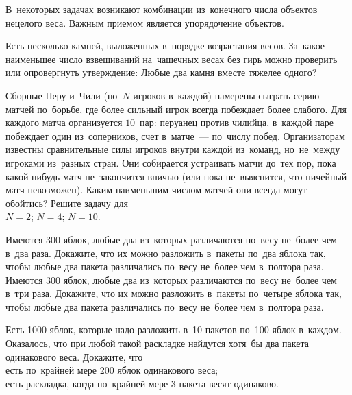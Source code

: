 



В~некоторых задачах возникают комбинации из~конечного числа объектов нецелого
веса.
Важным приемом является упорядочение объектов.

\begin{exercises}

\item
Есть несколько камней, выложенных в~порядке возрастания весов.
За~какое наименьшее число взвешиваний на~чашечных весах без гирь можно
проверить или опровергнуть утверждение: Любые два камня вместе тяжелее одного?

\item
Сборные Перу и~Чили (по~$N$ игроков в~каждой) намерены сыграть серию матчей
по~борьбе, где более сильный игрок всегда побеждает более слабого.
Для каждого матча организуется $10$~пар: перуанец против чилийца, в~каждой паре
побеждает один из~соперников, счет в~матче~--- по~числу побед.
Организаторам известны сравнительные силы игроков внутри каждой из~команд,
но~не~между игроками из~разных стран.
Они собирается устраивать матчи до~тех пор, пока какой-нибудь матч
не~закончится вничью (или пока не~выяснится, что ничейный матч невозможен).
Каким наименьшим числом матчей они всегда могут обойтись?
Решите задачу для
\\
\subproblem $N = 2$;
\qquad
\subproblem $N = 4$;
\qquad
\subproblem $N = 10$.

\item
\subproblem
Имеются 300 яблок, любые два из~которых различаются по~весу не~более чем
в~два раза.
Докажите, что их можно разложить в~пакеты по~два яблока так, чтобы любые два
пакета различались по~весу не~более чем в~полтора раза.
\\
\subproblem
Имеются 300 яблок, любые два из~которых различаются по~весу не~более чем в~три
раза.
Докажите, что их можно разложить в~пакеты по~четыре яблока так, чтобы любые два
пакета различались по~весу не~более чем в~полтора раза.

\item
Есть 1000 яблок, которые надо разложить в~10 пакетов по~100 яблок в~каждом.
Оказалось, что при любой такой раскладке найдутся хотя~бы два пакета
одинакового веса.
Докажите, что
\\
\subproblem есть по~крайней мере 200 яблок одинакового веса;
\\
\subproblem есть раскладка, когда по~крайней мере 3 пакета весят одинаково.

\end{exercises}

